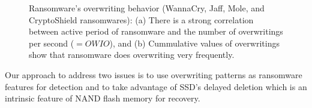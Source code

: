 \documentclass[conference]{IEEEtran}
\begin{document}
\begin{figure}
	\centering
	\caption{Ransomware's overwriting behavior (WannaCry, Jaff, Mole, and CryptoShield ransomwares):
	(a) There is a strong correlation between active period of ransomware and the number of overwritings per second ($=OWIO$), and 
	(b) Cummulative values of overwritings show that ransomware does overwriting very frequently.\label{fig-owio}}
\end{figure}

Our approach to address two issues is to use overwriting patterns 
as ransomware features for detection
and to take advantage of SSD's delayed deletion which is
an intrinsic feature of NAND flash memory for recovery.
\end{document}
